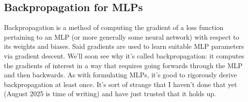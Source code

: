 \documentclass[11pt]{article}
\begin{document}
\subsection{Backpropagation for MLPs}
\label{subsec:backprop}

Backpropagation is a method of computing the gradient of a loss function pertaining to an MLP (or more generally some neural network) with respect to its weights and biases. Said gradients are used to learn suitable MLP parameters via gradient descent. We'll soon see why it's called backpropagation: it computes the gradients of interest in a way that requires going forwards through the MLP and then backwards. As with formulating MLPs, it's good to rigorously derive backpropagation at least once. It's sort of strange that I haven't done that yet (August 2025 is time of writing) and have just trusted that it holds up.
\end{document}
